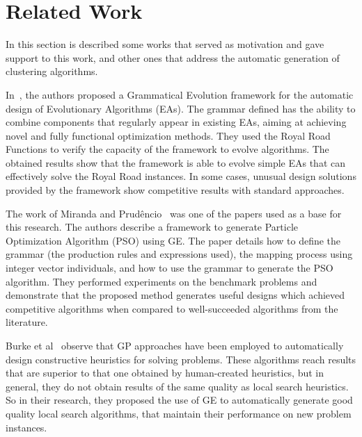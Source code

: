 \documentclass[conference]{IEEEtran}
\begin{document}
	
	
	\section{Related Work} \label{sec:related_work}
	
	In this section is described some works that served as motivation and gave support to this work, and other ones that address the automatic generation of clustering algorithms.
	
	
	In~\cite{lourencco2012evolving,lourencco2015IEEE}, the authors proposed a Grammatical Evolution framework for the automatic design of Evolutionary Algorithms (EAs). The grammar defined has the ability to combine components that regularly appear in existing EAs, aiming at achieving novel and fully functional optimization methods. They used the Royal Road Functions to verify the capacity of the framework to evolve algorithms. The obtained results show that the framework is able to evolve simple EAs that can effectively solve the Royal Road instances. In some cases, unusual design solutions provided by the framework show competitive results with standard approaches.
	
	The work of Miranda and Prudêncio~\cite{miranda2015gefpso} was one of the papers used as a base for this research. The authors describe a framework to generate Particle Optimization Algorithm (PSO) using GE. The paper details how to define the grammar (the production rules and expressions used), the mapping process using integer vector individuals, and how to use the grammar to generate the PSO algorithm. They performed experiments on the benchmark problems and demonstrate that the proposed method generates useful designs which achieved competitive algorithms when compared to well-succeeded algorithms from the literature.
	
	Burke et al~\cite{burke2012grammatical} observe that GP approaches have been employed to automatically design constructive heuristics for solving problems. These algorithms reach results that are superior to that one obtained by human-created heuristics, but in general, they do not obtain results of the same quality as local search heuristics. So in their research, they proposed the use of GE to automatically generate good quality local search algorithms, that maintain their performance on new problem instances.
	
\end{document}
